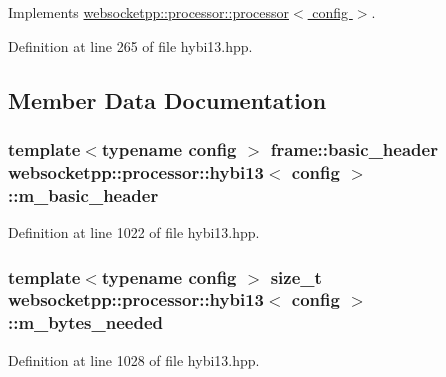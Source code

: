 Implements \hyperlink{classwebsocketpp_1_1processor_1_1processor_a2567795de600f5e19cb8f5c205c32bac}{websocketpp\+::processor\+::processor$<$ config $>$}.



Definition at line 265 of file hybi13.\+hpp.



\subsection{Member Data Documentation}
\hypertarget{classwebsocketpp_1_1processor_1_1hybi13_aa1b5aeeb8c4be9460854b1eb972a1563}{}
\subsubsection[{m\+\_\+basic\+\_\+header}]{\setlength{\rightskip}{0pt plus 5cm}template$<$typename config $>$ {\bf frame\+::basic\+\_\+header} {\bf websocketpp\+::processor\+::hybi13}$<$ config $>$\+::m\+\_\+basic\+\_\+header\hspace{0.3cm}{\ttfamily [protected]}}\label{classwebsocketpp_1_1processor_1_1hybi13_aa1b5aeeb8c4be9460854b1eb972a1563}


Definition at line 1022 of file hybi13.\+hpp.

\hypertarget{classwebsocketpp_1_1processor_1_1hybi13_a6e31d9b2d955fbdbd2a05ce325f06326}{}
\subsubsection[{m\+\_\+bytes\+\_\+needed}]{\setlength{\rightskip}{0pt plus 5cm}template$<$typename config $>$ size\+\_\+t {\bf websocketpp\+::processor\+::hybi13}$<$ config $>$\+::m\+\_\+bytes\+\_\+needed\hspace{0.3cm}{\ttfamily [protected]}}\label{classwebsocketpp_1_1processor_1_1hybi13_a6e31d9b2d955fbdbd2a05ce325f06326}


Definition at line 1028 of file hybi13.\+hpp.

\hypertarget{classwebsocketpp_1_1processor_1_1hybi13_a684c7ab5a31c2becad136063e0cd48a9}{}
